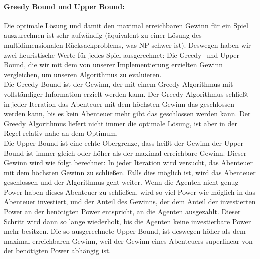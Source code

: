 \documentclass[fleqn,10pt]{SelfArx} %
\begin{document}
\paragraph{Greedy Bound und Upper Bound:}
Die optimale Lösung und damit den maximal erreichbaren Gewinn für ein Spiel auszurechnen ist sehr aufwändig (äquivalent zu einer Lösung des multidimensionalen Rücksackproblems, was NP-schwer ist). Deswegen haben wir zwei heuristische Werte für jedes Spiel ausgerechnet: Die Greedy- und Upper-Bound, die wir mit dem von unserer Implementierung erzielten Gewinn vergleichen, um unseren Algorithmus zu evaluieren. \\
Die Greedy Bound ist der Gewinn, der mit einem Greedy Algorithmus mit vollständiger Information erzielt werden kann. Der Greedy Algorithmus schließt in jeder Iteration das Abenteuer mit dem höchsten Gewinn das geschlossen werden kann, bis es kein Abenteuer mehr gibt das geschlossen werden kann. Der Greedy Algorithmus liefert nicht immer die optimale Lösung, ist aber in der Regel relativ nahe an dem Optimum.\\
Die Upper Bound ist eine echte Obergrenze, dass heißt der Gewinn der Upper Bound ist immer gleich oder höher als der maximal erreichbare Gewinn. Dieser Gewinn wird wie folgt berechnet: In jeder Iteration wird versucht, das Abenteuer mit dem höchsten Gewinn zu schließen. Falls dies möglich ist, wird das Abenteuer geschlossen und der Algorithmus geht weiter. Wenn die Agenten nicht genug Power haben dieses Abenteuer zu schließen, wird so viel Power wie möglich in das Abenteuer investiert, und der Anteil des Gewinns, der dem Anteil der investierten Power an der benötigten Power entspricht, an die Agenten ausgezahlt. Dieser Schritt wird dann so lange wiederholt, bis die Agenten keine investierbare Power mehr besitzen. Die so ausgerechnete Upper Bound, ist deswegen höher als dem maximal erreichbaren Gewinn, weil der Gewinn eines Abenteuers superlinear von der benötigten Power abhängig ist.
\end{document}
